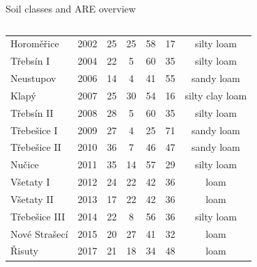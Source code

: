 \begin{block}{Soil classes and ARE overview}
\begin{columns}
\begin{column}{0.6\textwidth}
{\begin{table}[]
\begin{tabular}{lcccccc}
                \hline
                Horoměřice    & 2002    & 25                & 25             & 58            & 17            & silty loam      \\
                Třebsín I     & 2004    & 22                & 5              & 60            & 35            & silty loam      \\
                Neustupov     & 2006    & 14                & 4              & 41            & 55            & sandy loam      \\
                Klapý         & 2007    & 25                & 30             & 54            & 16            & silty clay loam \\
                Třebsín II    & 2008    & 28                & 5              & 60            & 35            & silty loam      \\
                Třebešice I   & 2009    & 27                & 4              & 25            & 71            & sandy loam      \\
                Třebešice II  & 2010    & 36                & 7              & 46            & 47            & sandy loam      \\
                Nučice        & 2011    & 35                & 14             & 57            & 29            & silty loam      \\
                Všetaty I     & 2012    & 24                & 22             & 42            & 36            & loam            \\
                Všetaty II    & 2013    & 17                & 22             & 42            & 36            & loam            \\
                Třebešice III & 2014    & 22                & 8              & 56            & 36            & silty loam      \\
                Nové Strašecí & 2015    & 20                & 27             & 41            & 32            & loam            \\
                Řisuty        & 2017    & 21                & 18             & 34            & 48            & loam           \\
                \hline
                \hline
                \end{tabular}
            \end{table}
            }
        \end{column}
    \end{columns}
\end{block}



        

